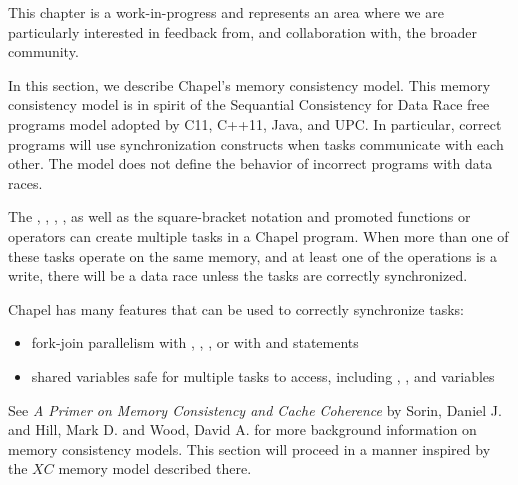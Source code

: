 \label{Memory_Consistency_Model}

\begin{openissue}
  This chapter is a work-in-progress and represents an area where we
  are particularly interested in feedback from, and collaboration
  with, the broader community.
\end{openissue}

In this section, we describe Chapel's memory consistency model. This memory
consistency model is in spirit of the Sequantial Consistency for Data Race free
programs model adopted by C11, C++11, Java, and UPC. In particular, correct
programs will use synchronization constructs when tasks communicate with each
other. The model does not define the behavior of incorrect programs with data
races.

The , , , , as well as
the square-bracket notation and promoted functions or operators can create
multiple tasks in a Chapel program. When more than one of these tasks operate
on the same memory, and at least one of the operations is a write, there will
be a data race unless the tasks are correctly synchronized.

Chapel has many features that can be used to correctly synchronize tasks:
\begin{itemize}
  \item fork-join parallelism with , , , or with  and  statements
  \item shared variables safe for multiple tasks to access, including , , and  variables
\end{itemize}

See \textit{A Primer on Memory Consistency and Cache Coherence} by Sorin,
Daniel J. and Hill, Mark D. and Wood, David A. for more background information
on memory consistency models. This section will proceed in a manner inspired by the $XC$ memory model described there.


